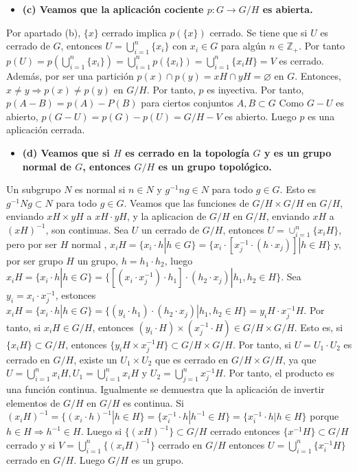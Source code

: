 \documentclass{article}
\begin{document}
\begin{itemize}
\item \bf (c) \rm Veamos que la aplicación cociente $p:G\rightarrow G/H$ es abierta.
\end{itemize}
Por apartado (b), $\{x\}$ cerrado implica $p(\{x\})$ cerrado. Se tiene que si $U$ es cerrado de $G$, entonces $U=\bigcup^n_{i=1 }\{ x_i\}$ con $x_i\in G$ para algún $n\in \mathbb{Z}_+$. Por tanto $p(U)=p(\bigcup^n_{i=1}\{x_i\})=\bigcup^n_{i=1}p(\{x_i\})=\bigcup^n_{i=1}\{x_iH\}=V$ es cerrado. Además, por ser una partición $p(x)\cap p(y)= xH\cap yH=\varnothing$ en $G$. Entonces, $x\neq y\Rightarrow p(x)\neq p(y)$ en $G/H$. Por tanto, $p$ es inyectiva. Por tanto, $p(A-B)=p(A)-P(B)$ para ciertos conjuntos $A,B\subset G$ Como $G-U$ es abierto, $p(G-U)= p(G)-p(U)=G/H-V$ es abierto. Luego $p$ es una aplicación cerrada.
\begin{itemize}
\item \bf (d) \rm Veamos que si $H$ es cerrado en la topología $G$ y es un grupo normal de $G$, entonces $G/H$ es un grupo topológico.
\end{itemize}
Un subgrupo $N$ es normal si $n\in N$ y $g^{-1}ng\in N$ para todo $g\in G$. Esto es $g^{-1}Ng\subset N$ para todo $g\in G$. Veamos que las funciones de $G/H\times G/H$ en $G/H$, enviando $xH \times yH$ a $xH \cdot yH$, y la aplicacion de $G/H$ en $G/H$, enviando $xH$ a $(xH)^{-1}$, son continuas. Sea $U$ un cerrado de $G/H$, entonces $U=\cup_{i=1}^n \{x_iH\}$, pero por ser $H$ normal , $x_iH=\{x_i\cdot h|h\in G\}=\{x_i\cdot [x_j^{-1}\cdot (h\cdot x_j)]|h\in H\}$ y, por ser grupo $H$ un grupo, $h=h_1\cdot h_2$, luego $x_iH=\{x_i\cdot h|h\in G\}=\{[(x_i\cdot x_j^{-1})\cdot h_1]\cdot (h_2\cdot x_j)|h_1,h_2\in H\}$. Sea $y_i=x_i \cdot x_j^{-1}$,  estonces  $x_iH=\{x_i\cdot h|h\in G\}=\{(y_i\cdot h_1)\cdot (h_2\cdot x_j)|h_1,h_2\in H\}=y_iH \cdot x_j^{-1}H$. Por tanto, si $x_iH\in G/H$, entonces $(y_i\cdot H)\times (x_j^{-1}\cdot H)\in G/H\times G/H$. Esto es, si $\{x_iH\}\subset G/H$, entonces $\{y_iH\times x_j^{-1}H\}\subset G/H\times G/H$. Por tanto, si $U=U_1\cdot U_2$ es cerrado en $G/H$, existe un $U_1\times U_2$ que es cerrado en $G/H\times G/H$, ya que $U=\bigcup_{i=1}^{n}x_iH,U_1=\bigcup_{i=1}^{n}x_iH\text{ y }U_2= \bigcup_{j=1}^{n}x_j^{-1}H$. Por tanto, el producto es una función continua. Igualmente se demuestra que la aplicación de invertir elementos de $G/H$ en $G/H$ es continua. Si
$(x_iH)^{-1}=\{(x_i\cdot h)^{-1}|h\in H\}=\{x^{-1}_i\cdot h|h^{-1}\in H\}=\{x^{-1}_i\cdot h|h\in H\}$ porque $h\in H\Rightarrow h^{-1}\in H$. Luego si $\{(xH)^{-1}\}\subset G/H$ cerrado entonces $\{x^{-1}H\}\subset G/H$ cerrado y si $V=\bigcup_{i=1}^n\{(x_iH)^{-1}\}$ cerrado en $G/H$ entonces $U=\bigcup_{i=1}^n\{x_i^{-1}H\}$ cerrado en $G/H$. Luego $G/H$ es un grupo.
\end{document}
